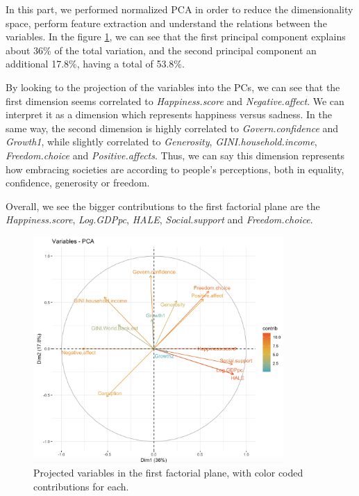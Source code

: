 \documentclass[12pt]{extarticle}
\begin{document}
In this part, we performed normalized PCA in order to reduce the dimensionality space, perform feature extraction and understand the relations between the variables. In the figure \ref{fig:pca}, we can see that the first principal component explains about 36\% of the total variation, and the second principal component an additional 17.8\%, having a total of 53.8\%.

By looking to the projection of the variables into the PCs, we can see that the first dimension seems correlated to \textit{Happiness.score} and \textit{Negative.affect}. We can interpret it as a dimension which represents happiness versus sadness. In the same way,  the second dimension is highly correlated to \textit{Govern.confidence} and \textit{Growth1}, while slightly correlated  to \textit{Generosity}, \textit{GINI.household.income}, \textit{Freedom.choice} and \textit{Positive.affects}. Thus, we can say this dimension represents how embracing societies are according to people’s perceptions, both in equality, confidence, generosity or freedom.

Overall, we see the bigger contributions to the first factorial plane are the \textit{Happiness.score}, \textit{Log.GDPpc}, \textit{HALE}, \textit{Social.support} and \textit{Freedom.choice}.

\begin{figure}[H]
  \centering
    \includegraphics[width=0.85\textwidth]{figures/pca_var.png}
    \caption{Projected variables in the first factorial plane, with color coded contributions for each.\label{fig:pca}}
\end{figure}
\end{document}
